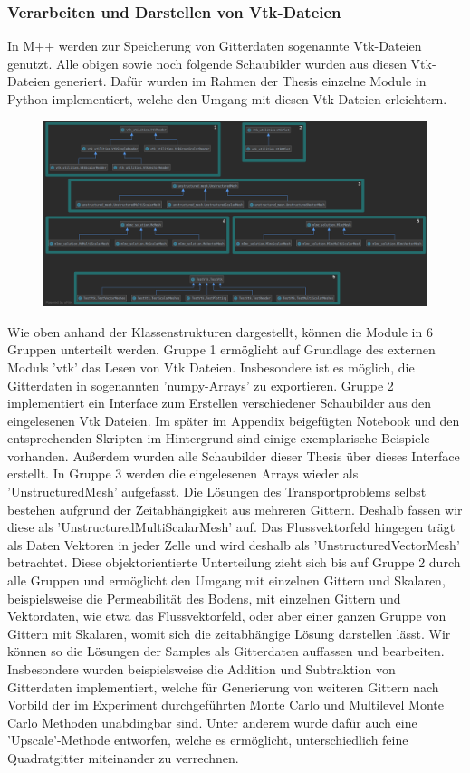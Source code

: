 \subsubsection{Verarbeiten und Darstellen von Vtk-Dateien}
In M++ werden zur Speicherung von Gitterdaten sogenannte Vtk-Dateien genutzt. Alle obigen sowie noch folgende Schaubilder wurden aus diesen Vtk-Dateien generiert. Dafür wurden im Rahmen der Thesis einzelne Module in Python implementiert, welche den Umgang mit diesen Vtk-Dateien erleichtern. 
\begin{figure}[H]
	\centering
	\includegraphics[width=\textwidth]{plots/klassenuml2.png} 
\end{figure}
Wie oben anhand der Klassenstrukturen dargestellt, können die Module in 6 Gruppen unterteilt werden. Gruppe 1 ermöglicht auf Grundlage des externen Moduls 'vtk' \cite{sitevtk} das Lesen von Vtk Dateien. Insbesondere ist es möglich, die Gitterdaten in sogenannten 'numpy-Arrays' zu exportieren. 
Gruppe 2 implementiert ein Interface zum Erstellen verschiedener Schaubilder aus den eingelesenen Vtk Dateien. Im später im Appendix beigefügten Notebook und den entsprechenden Skripten im Hintergrund sind einige exemplarische Beispiele vorhanden. Außerdem wurden alle Schaubilder dieser Thesis über dieses Interface erstellt.
In Gruppe 3 werden die eingelesenen Arrays wieder als 'UnstructuredMesh' aufgefasst. Die Lösungen des Transportproblems selbst bestehen aufgrund der Zeitabhängigkeit aus mehreren Gittern. Deshalb fassen wir diese als 'UnstructuredMultiScalarMesh' auf. Das Flussvektorfeld hingegen trägt als Daten Vektoren in jeder Zelle und wird deshalb als 'UnstructuredVectorMesh' betrachtet. Diese objektorientierte Unterteilung zieht sich bis auf Gruppe 2 durch alle Gruppen und ermöglicht den Umgang mit einzelnen Gittern und Skalaren, beispielsweise die Permeabilität des Bodens, mit einzelnen Gittern und Vektordaten, wie etwa das Flussvektorfeld, oder aber einer ganzen Gruppe von Gittern mit Skalaren, womit sich die zeitabhängige Lösung darstellen lässt. Wir können so die Lösungen der Samples als Gitterdaten auffassen und bearbeiten. Insbesondere wurden beispielsweise die Addition und Subtraktion von Gitterdaten implementiert, welche für Generierung von weiteren Gittern nach Vorbild der im Experiment durchgeführten Monte Carlo und Multilevel Monte Carlo Methoden unabdingbar sind. Unter anderem wurde dafür auch eine 'Upscale'-Methode entworfen, welche es ermöglicht, unterschiedlich feine Quadratgitter miteinander zu verrechnen.

